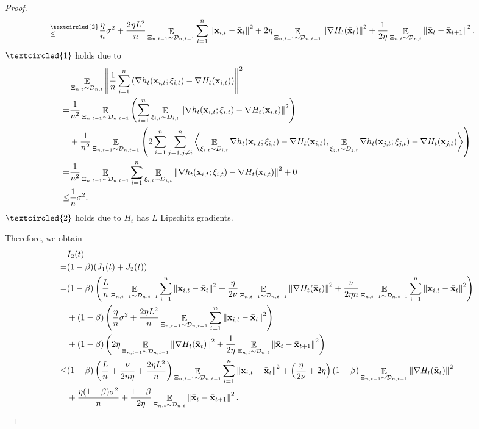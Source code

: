 \documentclass{article}
\begin{document}
\begin{proof}
\begin{align}
\refabovecir{\le}{\textcircled{2}} & \frac{\eta}{n} \sigma^2 + \frac{2\eta L^2}{n}\EE_{ \Xi_{n,t-1} \sim \Dcal_{n,t-1} }\sum_{i=1}^n \lrnorm{\x_{i,t} - \bar{\x}_t }^2 + 2\eta \EE_{ \Xi_{n,t-1} \sim \Dcal_{n,t-1} }\lrnorm{\nabla H_t(\bar{\x}_t)}^2 + \frac{1}{2\eta} \EE_{ \Xi_{n,t} \sim \Dcal_{n,t} }\lrnorm{ \bar{\x}_t - \bar{\x}_{t+1}}^2.
\end{align} $\textcircled{1}$ holds due to
\begin{align}
\nonumber
& \mathop{\mathbb{E}}_{ \Xi_{n,t} \sim \mathcal{D}_{n,t} }\left\lVert\frac{1}{n}\sum_{i=1}^n \left(  \nabla h_t({\bf x}_{i,t};\xi_{i,t}) - \nabla H_t({\bf x}_{i,t})  \right) \right\rVert^2 \\ \nonumber
= & \frac{1}{n^2}\mathop{\mathbb{E}}_{ \Xi_{n,t-1} \sim \mathcal{D}_{n,t-1} }\left(  \sum_{i=1}^n \mathop{\mathbb{E}}_{ \xi_{i,t} \sim D_{i,t} }\left\lVert \nabla h_t({\bf x}_{i,t};\xi_{i,t}) - \nabla H_t({\bf x}_{i,t}) \right\rVert^2   \right) \\ \nonumber 
& + \frac{1}{n^2}\mathop{\mathbb{E}}_{ \Xi_{n,t-1} \sim \mathcal{D}_{n,t-1} }\left( 2\sum_{i=1}^n\sum_{j=1, j\neq i}^n\left\langle \mathop{\mathbb{E}}_{ \xi_{i,t} \sim D_{i,t} }\nabla h_t({\bf x}_{i,t};\xi_{i,t}) - \nabla H_t({\bf x}_{i,t}),  \mathop{\mathbb{E}}_{ \xi_{j,t} \sim D_{j,t} } \nabla h_t({\bf x}_{j,t};\xi_{j,t}) - \nabla H_t({\bf x}_{j,t}) \right\rangle  \right) \\ \nonumber
= & \frac{1}{n^2}\mathop{\mathbb{E}}_{ \Xi_{n,t-1} \sim \mathcal{D}_{n,t-1} }\sum_{i=1}^n \mathop{\mathbb{E}}_{ \xi_{i,t} \sim D_{i,t} }\left\lVert \nabla h_t({\bf x}_{i,t};\xi_{i,t}) - \nabla H_t({\bf x}_{i,t}) \right\rVert^2 + 0 \\ \nonumber
\le & \frac{1}{n} \sigma^2.
\end{align} $\textcircled{2}$ holds due to $H_t$ has $L$ Lipschitz gradients.

 Therefore, we obtain
\begin{align}
\nonumber
& I_2(t) \\ \nonumber 
= & (1-\beta)(J_1(t) + J_2(t)) \\ \nonumber
= &  (1-\beta)\left(  \frac{L}{n}\mathop{\mathbb{E}}_{ \Xi_{n,t-1} \sim \mathcal{D}_{n,t-1} }\sum_{i=1}^n \left\lVert{\bf x}_{i,t} - \bar{{\bf x}}_t\right\rVert^2 + \frac{\eta}{2\nu}\mathop{\mathbb{E}}_{ \Xi_{n,t-1} \sim \mathcal{D}_{n,t-1} }\left\lVert\nabla H_t(\bar{{\bf x}}_t)\right\rVert^2 + \frac{\nu}{2\eta n}\mathop{\mathbb{E}}_{ \Xi_{n,t-1} \sim \mathcal{D}_{n,t-1} }\sum_{i=1}^n\left\lVert{\bf x}_{i,t} - \bar{{\bf x}}_t \right\rVert^2  \right) \\ \nonumber
& + (1-\beta)\left(  \frac{\eta}{n} \sigma^2 + \frac{2\eta L^2}{n}\mathop{\mathbb{E}}_{ \Xi_{n,t-1} \sim \mathcal{D}_{n,t-1} }\sum_{i=1}^n \left\lVert{\bf x}_{i,t} - \bar{{\bf x}}_t \right\rVert^2  \right) \\ \nonumber 
& + (1-\beta)\left(  2\eta \mathop{\mathbb{E}}_{ \Xi_{n,t-1} \sim \mathcal{D}_{n,t-1} }\left\lVert\nabla H_t(\bar{{\bf x}}_t)\right\rVert^2 + \frac{1}{2\eta} \mathop{\mathbb{E}}_{ \Xi_{n,t} \sim \mathcal{D}_{n,t} }\left\lVert \bar{{\bf x}}_t - \bar{{\bf x}}_{t+1}\right\rVert^2  \right) \\ \nonumber
\le &  (1-\beta)\left(  \frac{L}{n} + \frac{\nu}{2n\eta} + \frac{2\eta L^2}{n}  \right)\mathop{\mathbb{E}}_{ \Xi_{n,t-1} \sim \mathcal{D}_{n,t-1} }\sum_{i=1}^n\left\lVert{\bf x}_{i,t} - \bar{{\bf x}}_t \right\rVert^2   + \left(  \frac{\eta}{2\nu} + 2\eta  \right)(1-\beta)\mathop{\mathbb{E}}_{ \Xi_{n,t-1} \sim \mathcal{D}_{n,t-1} }\left\lVert\nabla H_t(\bar{{\bf x}}_t)\right\rVert^2 \\ \nonumber 
&+ \frac{\eta (1-\beta)\sigma^2}{n} +  \frac{1-\beta}{2\eta} \mathop{\mathbb{E}}_{ \Xi_{n,t} \sim \mathcal{D}_{n,t} }\left\lVert \bar{{\bf x}}_t - \bar{{\bf x}}_{t+1}\right\rVert^2.
\end{align}


\end{proof}
\end{document}
